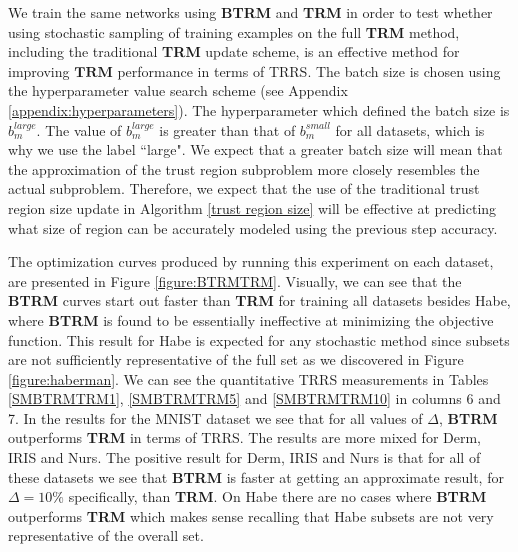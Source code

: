\documentclass[letterpaper,12pt,titlepage,oneside,final]{book}
\begin{document}
	We train the same networks using \textbf{BTRM} and \textbf{TRM} in order to test whether using stochastic sampling of training examples on the full \textbf{TRM} method, including the traditional \textbf{TRM} update scheme, is an effective method for improving $\mathbf{TRM}$ performance in terms of TRRS. The batch size is chosen using the hyperparameter value search scheme (see Appendix \ref{appendix:hyperparameters}). The hyperparameter which defined the batch size is $b_{m}^{large}$. The value of $b_{m}^{large}$ is greater than that of $b_{m}^{small}$ for all datasets, which is why we use the label ``large". We expect that a greater batch size will mean that the approximation of the trust region subproblem more closely resembles the actual subproblem. Therefore, we expect that the use of the traditional trust region size update in Algorithm \ref{trust region size} will be effective at predicting what size of region can be accurately modeled using the previous step accuracy.
	
	The optimization curves produced by running this experiment on each dataset, are presented in Figure \ref{figure:BTRMTRM}. Visually, we can see that the \textbf{BTRM} curves start out faster than \textbf{TRM} for training all datasets besides Habe, where \textbf{BTRM} is found to be essentially ineffective at minimizing the objective function. This result for Habe is expected for any stochastic method since subsets are not sufficiently representative of the full set as we discovered in Figure \ref{figure:haberman}. We can see the quantitative TRRS measurements in Tables \ref{SMBTRMTRM1}, \ref{SMBTRMTRM5} and \ref{SMBTRMTRM10} in columns 6 and 7. In the results for the MNIST dataset we see that for all values of $\Delta$, \textbf{BTRM} outperforms \textbf{TRM} in terms of TRRS. The results are more mixed for Derm, IRIS and Nurs. The positive result for Derm, IRIS and Nurs is that for all of these datasets we see that \textbf{BTRM} is faster at getting an approximate result, for $\Delta=10\%$ specifically, than \textbf{TRM}. On Habe there are no cases where \textbf{BTRM} outperforms \textbf{TRM} which makes sense recalling that Habe subsets are not very representative of the overall set.  
\end{document}
